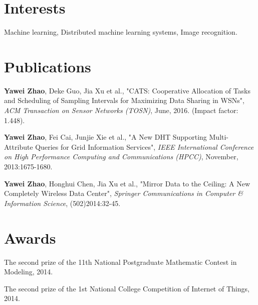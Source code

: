\documentclass[a4paper,10pt]{article}
\begin{document}
\section{Interests}
Machine learning, Distributed machine learning systems, Image recognition.

\section{Publications}
\textbf{Yawei Zhao}, Deke Guo, Jia Xu et al., "CATS: Cooperative Allocation of Tasks and Scheduling of Sampling Intervals for Maximizing Data Sharing in WSNs", \emph{ACM Transaction on Sensor Networks (TOSN)}, June, 2016. (Impact factor: 1.448).

\textbf{Yawei Zhao}, Fei Cai, Junjie Xie et al., "A New DHT Supporting Multi-Attribute Queries for Grid Information Services", \emph{IEEE International Conference on High Performance Computing and Communications (HPCC)}, November, 2013:1675-1680.

\textbf{Yawei Zhao}, Honghui Chen, Jia Xu et al., "Mirror Data to the Ceiling: A New Completely Wireless Data Center", \emph{Springer Communications in Computer \& Information Science}, (502)2014:32-45.
 
\section{Awards}
The second prize of the 11th National Postgraduate Mathematic Contest in Modeling, 2014.

The second prize of the 1st National College Competition of Internet of Things, 2014.
\end{document}
